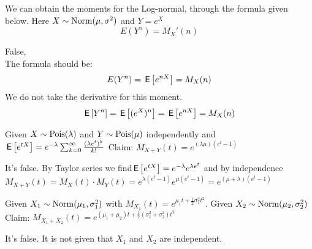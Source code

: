 \documentclass[tf-tutorial-all.tex]{subfiles}
\begin{document}
\begin{truefalse}
We can obtain the moments for the Log-normal, through the formula given below.
Here $X \sim \mathrm{Norm}(\mu, \sigma^{2})$ and $Y = e^{X}$
$$E(Y^{n}) =  M_{X}'(n) $$
    \begin{solution}
        False, 
        \\The formula should be:
        $$E(Y^{n}) = \,\mathsf{E}\left[e^{n X}\right] = M_{X}(n) $$
        We do not take the derivative for this moment. 
        $$\,\mathsf{E}\left[Y^{n}\right] = \,\mathsf{E}\left[(e^{X}) ^{n}\right] = \,\mathsf{E}\left[e^{nX}\right] = M_{X}(n)$$
    \end{solution}
\end{truefalse}

\begin{truefalse}
Given  $X\sim \mathrm{Pois}(\lambda)$ and $Y \sim \mathrm{Pois}(\mu)$ independently and  $\,\mathsf{E}\left[e^{tX}\right] = e^{-\lambda}\sum^{\infty}_{k=0} \frac{(\lambda e^t)^k}{k!}$
Claim: $M_{X+Y}(t) = e^{(\lambda \mu)(e^t-1)}$
\begin{solution}
It's false. By Taylor series we find$ \,\mathsf{E}\left[e^{tX}\right] = e^{-\lambda} e^{\lambda e^t}$ and by independence $M_{X+Y}(t) = M_X(t) \cdot M_Y(t) = e^{\lambda(e^t-1)} e^{\mu(e^t-1)} = e^{(\mu + \lambda)(e^t-1)}$
\end{solution}
\end{truefalse}


\begin{truefalse}
Given $X_1\sim \mathrm{Norm}(\mu_1, \sigma_1^2)$ with $M_{X_1}(t) = e^{\mu_1t + \frac{1}{2}\sigma_1^2t^2}$.
Given  $X_2\sim \mathrm{Norm}(\mu_2, \sigma_2^2)$
Claim: $M_{X_1+X_2}(t) = e^{(\mu_1 + \mu_2)t +\frac{1}{2}(\sigma_1^2 + \sigma_2^2)t^2}$
\begin{solution}
It's false. It is not given that $X_1$ and $X_2$ are independent.
\end{solution}
\end{truefalse}
\end{document}
